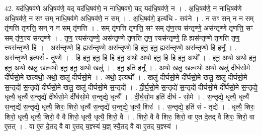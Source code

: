 \documentclass[17pt]{extarticle}
\begin{document}
42. यद॑धि॒षव॑णे अधि॒षव॑णे॒ यद् यद॑धि॒षव॑णे॒ न नाधि॒षव॑णे॒ यद् यद॑धि॒षव॑णे॒ न । . अ॒धि॒षव॑णे॒ न नाधि॒षव॑णे अधि॒षव॑णे॒ न सꣳ सम् नाधि॒षव॑णे अधि॒षव॑णे॒ न सम् । . अ॒धि॒षव॑णे॒ इत्य॑धि - सव॑ने । . न सꣳ सन् न न सम् तृ॑णत्ति तृणत्ति॒ सन् न न सम् तृ॑णत्ति । . सम् तृ॑णत्ति तृणत्ति॒ सꣳ सम् तृ॑ण॒त्त्य स॑न्तृण्णे॒ अस॑न्तृण्णे तृणत्ति॒ सꣳ सम् तृ॑ण॒त्त्य स॑न्तृण्णे । . तृ॒ण॒ त्त्यस॑न्तृण्णे॒ अस॑न्तृण्णे तृणत्ति तृण॒ त्त्यस॑न्तृण्णे॒ हि ह्यस॑न्तृण्णे तृणत्ति तृण॒
त्त्यस॑न्तृण्णे॒ हि । . अस॑न्तृण्णे॒ हि ह्यस॑न्तृण्णे॒ अस॑न्तृण्णे॒ हि हनू॒ हनू॒ ह्यस॑न्तृण्णे॒ अस॑न्तृण्णे॒ हि हनू᳚ । . अस॑न्तृण्णे॒ इत्यसं᳚ - तृ॒ण्णे॒ । . हि हनू॒ हनू॒ हि हि हनू॒ अथो॒ अथो॒ हनू॒ हि हि हनू॒ अथो᳚ । . हनू॒ अथो॒ अथो॒ हनू॒ हनू॒ अथो॒ खलु॒ खल्वथो॒ हनू॒ हनू॒ अथो॒ खलु॑ । . हनू॒ इति॒ हनू᳚ । . अथो॒ खलु॒ खल्वथो॒ अथो॒ खलु॑ दीर्घसो॒मे दी᳚र्घसो॒मे खल्वथो॒ अथो॒ खलु॑ दीर्घसो॒मे । . अथो॒ इत्यथो᳚ । . खलु॑ दीर्घसो॒मे दी᳚र्घसो॒मे खलु॒ खलु॑ दीर्घसो॒मे स॒न्तृद्ये॑ स॒न्तृद्ये॑ दीर्घसो॒मे खलु॒ खलु॑ दीर्घसो॒मे स॒न्तृद्ये᳚ । . दी॒र्घ॒सो॒मे स॒न्तृद्ये॑ स॒न्तृद्ये॑ दीर्घसो॒मे दी᳚र्घसो॒मे स॒न्तृद्ये॒ धृत्यै॒ धृत्यै॑ स॒न्तृद्ये॑ दीर्घसो॒मे दी᳚र्घसो॒मे स॒न्तृद्ये॒ धृत्यै᳚ । . दी॒र्घ॒सो॒म इति॑ दीर्घ - सो॒मे । . स॒न्तृद्ये॒ धृत्यै॒ धृत्यै॑ स॒न्तृद्ये॑ स॒न्तृद्ये॒ धृत्यै॒ शिरः॒ शिरो॒ धृत्यै॑ स॒न्तृद्ये॑ स॒न्तृद्ये॒ धृत्यै॒ शिरः॑ । . स॒न्तृद्ये॒ इति॑ सं - तृद्ये᳚ । . धृत्यै॒ शिरः॒ शिरो॒ धृत्यै॒ धृत्यै॒ शिरो॒ वै वै शिरो॒ धृत्यै॒ धृत्यै॒ शिरो॒ वै । . शिरो॒ वै वै शिरः॒ शिरो॒ वा ए॒त दे॒तद् वै शिरः॒ शिरो॒ वा ए॒तत् । . वा ए॒त दे॒तद् वै वा ए॒तद् य॒ज्ञ्स्य॑ य॒ज्ञ् स्यै॒तद् वै वा ए॒तद् य॒ज्ञ्स्य॑ । \newline
\end{document}
